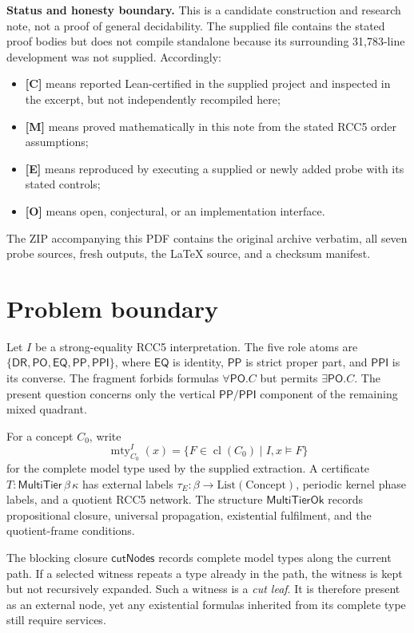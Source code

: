 \documentclass[11pt,letterpaper]{article}
\newcommand{\DR}{\ensuremath{\mathsf{DR}}}
\newcommand{\PO}{\ensuremath{\mathsf{PO}}}
\newcommand{\EQ}{\ensuremath{\mathsf{EQ}}}
\newcommand{\PP}{\ensuremath{\mathsf{PP}}}
\newcommand{\PPI}{\ensuremath{\mathsf{PPI}}}
\newcommand{\mty}{\operatorname{mty}}
\newcommand{\cl}{\operatorname{cl}}
\newcommand{\sat}{\models}
\newcommand{\MultiTier}{\ensuremath{\mathsf{MultiTier}}}
\newcommand{\MultiTierOk}{\ensuremath{\mathsf{MultiTierOk}}}
\newcommand{\cutNodes}{\ensuremath{\mathsf{cutNodes}}}
\theoremstyle{definition}
\theoremstyle{plain}
\theoremstyle{remark}
\begin{document}
\begin{statusbox}
\textbf{Status and honesty boundary.}
This is a candidate construction and research note, not a proof of general
decidability.  The supplied file  contains the stated
proof bodies but does not compile standalone because its surrounding
31,783-line development was not supplied.  Accordingly:
\begin{itemize}
  \item \textbf{[C]} means reported Lean-certified in the supplied project and
        inspected in the excerpt, but not independently recompiled here;
  \item \textbf{[M]} means proved mathematically in this note from the stated
        RCC5 order assumptions;
  \item \textbf{[E]} means reproduced by executing a supplied or newly added
        probe with its stated controls;
  \item \textbf{[O]} means open, conjectural, or an implementation interface.
\end{itemize}
The ZIP accompanying this PDF contains the original archive verbatim, all seven
probe sources, fresh outputs, the LaTeX source, and a checksum manifest.
\end{statusbox}

\tableofcontents
\newpage

\section{Problem boundary}

Let $I$ be a strong-equality RCC5 interpretation.  The five role atoms are
$\{\DR,\PO,\EQ,\PP,\PPI\}$, where $\EQ$ is identity, $\PP$ is strict proper
part, and $\PPI$ is its converse.  The fragment forbids formulas
$\forall\PO.C$ but permits $\exists\PO.C$.  The present question concerns only
the vertical $\PP/\PPI$ component of the remaining mixed quadrant.

For a concept $C_0$, write
\[
  \mty_{C_0}^{I}(x)
  = \{F\in\cl(C_0) \mid I,x\sat F\}
\]
for the complete model type used by the supplied extraction.  A certificate
$T : \MultiTier\,\beta\,\kappa$ has external labels
$\tau_E : \beta\to\mathrm{List}(\mathrm{Concept})$, periodic kernel phase
labels, and a quotient RCC5 network.  The structure \MultiTierOk{} records
propositional closure, universal propagation, existential fulfilment, and the
quotient-frame conditions.

The blocking closure \cutNodes{} records complete model types along the current
path.  If a selected witness repeats a type already in the path, the witness is
kept but not recursively expanded.  Such a witness is a \emph{cut leaf}.  It is
therefore present as an external node, yet any existential formulas inherited
from its complete type still require services.
\end{document}
